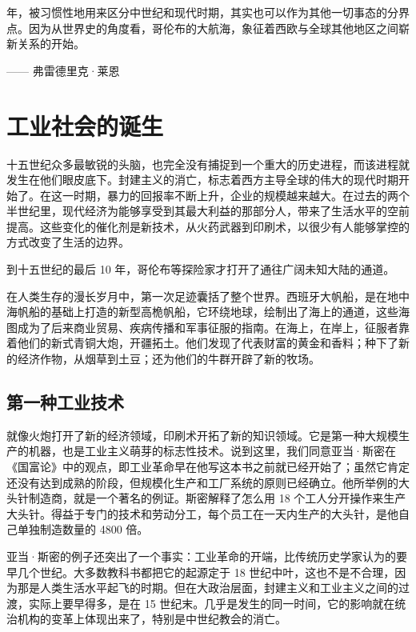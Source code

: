 \begin{tcolorbox}
 年，被习惯性地用来区分中世纪和现代时期，其实也可以作为其他一切事态的分界点。因为从世界史的角度看，哥伦布的大航海，象征着西欧与全球其他地区之间崭新关系的开始。
\begin{flushright}
—— 弗雷德里克·莱恩
\end{flushright}
\end{tcolorbox}


\section{工业社会的诞生}
十五世纪众多最敏锐的头脑，也完全没有捕捉到一个重大的历史进程，而该进程就发生在他们眼皮底下。封建主义的消亡，标志着西方主导全球的伟大的现代时期开始了。在这一时期，暴力的回报率不断上升，企业的规模越来越大。在过去的两个半世纪里，现代经济为能够享受到其最大利益的那部分人，带来了生活水平的空前提高。这些变化的催化剂是新技术，从火药武器到印刷术，以很少有人能够掌控的方式改变了生活的边界。

到十五世纪的最后 10 年，哥伦布等探险家才打开了通往广阔未知大陆的通道。

在人类生存的漫长岁月中，第一次足迹囊括了整个世界。西班牙大帆船，是在地中海帆船的基础上打造的新型高桅帆船，它环绕地球，绘制出了海上的通道，这些海图成为了后来商业贸易、疾病传播和军事征服的指南。在海上，在岸上，征服者靠着他们的新式青铜大炮，开疆拓土。他们发现了代表财富的黄金和香料；种下了新的经济作物，从烟草到土豆；还为他们的牛群开辟了新的牧场。

\subsection{第一种工业技术}
就像火炮打开了新的经济领域，印刷术开拓了新的知识领域。它是第一种大规模生产的机器，也是工业主义萌芽的标志性技术。说到这里，我们同意亚当·斯密在《国富论》中的观点，即工业革命早在他写这本书之前就已经开始了；虽然它肯定还没有达到成熟的阶段，但规模化生产和工厂系统的原则已经确立。他所举例的大头针制造商，就是一个著名的例证。斯密解释了怎么用 18 个工人分开操作来生产大头针。得益于专门的技术和劳动分工，每个员工在一天内生产的大头针，是他自己单独制造数量的 4800 倍。

亚当·斯密的例子还突出了一个事实：工业革命的开端，比传统历史学家认为的要早几个世纪。大多数教科书都把它的起源定于 18 世纪中叶，这也不是不合理，因为那是人类生活水平起飞的时期。但在大政治层面，封建主义和工业主义之间的过渡，实际上要早得多，是在 15 世纪末。几乎是发生的同一时间，它的影响就在统治机构的变革上体现出来了，特别是中世纪教会的消亡。

